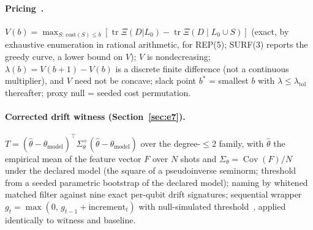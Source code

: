 \paragraph{Pricing~\cite{sbt-spend}.} $V(b) = \max_{S:\, \mathrm{cost}(S) \le b} [\operatorname{tr}\Xi(D|L_0) - \operatorname{tr}\Xi(D \mid L_0 \cup S)]$ (exact, by exhaustive enumeration in rational arithmetic, for REP(5); SURF(3) reports the greedy curve, a lower bound on $V$); $V$ is nondecreasing; $\lambda(b) = V(b{+}1) - V(b)$ is a discrete finite difference (not a continuous multiplier), and $V$ need not be concave; slack point $b^{*}$ = smallest $b$ with $\lambda \le \lambda_{\mathrm{tol}}$ thereafter; proxy null = seeded cost permutation.

\paragraph{Corrected drift witness (Section~\ref{sec:e7}).} $T = (\hat\theta - \theta_{\mathrm{model}})^{\top} \Sigma_\theta^{+} (\hat\theta - \theta_{\mathrm{model}})$ over the degree-$\le2$ family, with $\hat\theta$ the empirical mean of the feature vector $F$ over $N$ shots and $\Sigma_\theta = \operatorname{Cov}(F)/N$ under the declared model (the square of a pseudoinverse seminorm; threshold from a seeded parametric bootstrap of the declared model); naming by whitened matched filter against nine exact per-qubit drift signatures; sequential wrapper $g_t = \max(0,\, g_{t-1} + \mathrm{increment}_t)$ with null-simulated threshold~\cite{page1954continuous}, applied identically to witness and baseline.

